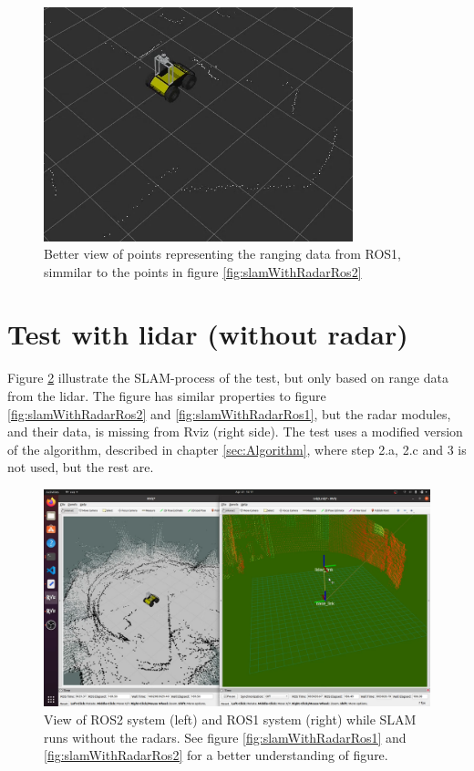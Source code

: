 \begin{figure}[H]
    \centering
    \includegraphics[width=0.8\textwidth]{Figures/radarAndLidarPointsInRos2.png}
    \caption{Better view of points representing the ranging data from ROS1, simmilar to the points in figure \ref{fig:slamWithRadarRos2}}
    \label{fig:radarAndLidarPointsInRos2}
\end{figure}

\section{Test with lidar (without radar)}
Figure \ref{fig:slamWithoutRadar} illustrate the SLAM-process of the test, but only based on range data from the lidar. The figure has similar properties to figure \ref{fig:slamWithRadarRos2} and \ref{fig:slamWithRadarRos1}, but the radar modules, and their data, is missing from Rviz (right side). The test uses a modified version of the algorithm, described in chapter \ref{sec:Algorithm}, where step 2.a, 2.c and 3 is not used, but the rest are.

\begin{figure}[H]
    \centering
    \includegraphics[width=\textwidth]{Figures/slamWithoutRadar.png}
    \caption{{View of ROS2 system (left) and ROS1 system (right) while SLAM runs without the radars. See figure \ref{fig:slamWithRadarRos1} and \ref{fig:slamWithRadarRos2} for a better understanding of figure.}}
    \label{fig:slamWithoutRadar}
\end{figure}

